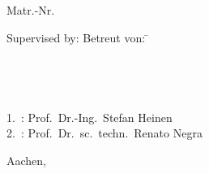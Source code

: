 \begin{titlepage}
{{\Large {} \\}~{\Large \IASAuthor\\}
{\Large Matr.-Nr. \IASMatNr\\} \bigskip \bigskip

\begin{tabbing}
{ \Large Supervised by:}
{ \Large Betreut von:} \= \Large \IASSupervisor \\
{ 	\> \Large \IASSupervisortwo \\   
}{ \> \\ }
 \> \\
 \> \\
\Large 1.~: \> \Large Prof.~Dr.-Ing.~Stefan Heinen \\
\Large 2.~: \> \Large Prof.~Dr.~sc.~techn.~Renato Negra \\
\end{tabbing}


\centering{ \Large \IASNumber}
\begin{flushright}
	 {\Large Aachen, \IASSubmissionDate} \\~\\
\end{flushright}
\newpage

\setlength{\voffset}{0in}

\thispagestyle{empty}
\rule{0pt}{0pt}
\cleardoublepage

}%
\end{titlepage}

\hypersetup{pageanchor=true}
\cleardoublepage
